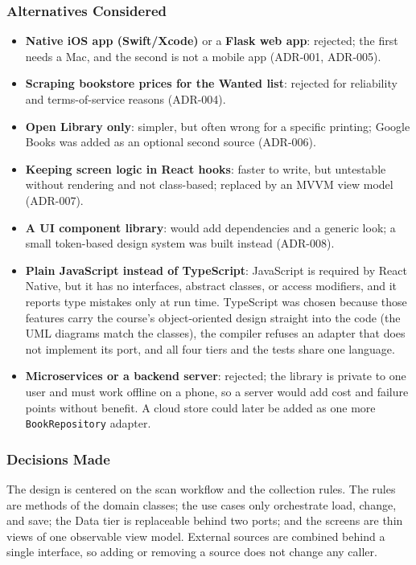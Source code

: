 \documentclass[12pt]{article}
\begin{document}
\subsubsection{Alternatives Considered}

\begin{itemize}
    \item \textbf{Native iOS app (Swift/Xcode)} or a \textbf{Flask web app}: rejected; the first needs a Mac, and the second is not a mobile app (ADR-001, ADR-005).
    \item \textbf{Scraping bookstore prices for the Wanted list}: rejected for reliability and terms-of-service reasons (ADR-004).
    \item \textbf{Open Library only}: simpler, but often wrong for a specific printing; Google Books was added as an optional second source (ADR-006).
    \item \textbf{Keeping screen logic in React hooks}: faster to write, but untestable without rendering and not class-based; replaced by an MVVM view model (ADR-007).
    \item \textbf{A UI component library}: would add dependencies and a generic look; a small token-based design system was built instead (ADR-008).
    \item \textbf{Plain JavaScript instead of TypeScript}: JavaScript is required by React Native, but it has no interfaces, abstract classes, or access modifiers, and it reports type mistakes only at run time. TypeScript was chosen because those features carry the course's object-oriented design straight into the code (the UML diagrams match the classes), the compiler refuses an adapter that does not implement its port, and all four tiers and the tests share one language.
    \item \textbf{Microservices or a backend server}: rejected; the library is private to one user and must work offline on a phone, so a server would add cost and failure points without benefit. A cloud store could later be added as one more \texttt{BookRepository} adapter.
\end{itemize}

\subsubsection{Decisions Made}

The design is centered on the scan workflow and the collection rules. The rules are methods of the domain classes; the use cases only orchestrate load, change, and save; the Data tier is replaceable behind two ports; and the screens are thin views of one observable view model. External sources are combined behind a single interface, so adding or removing a source does not change any caller.
\end{document}
